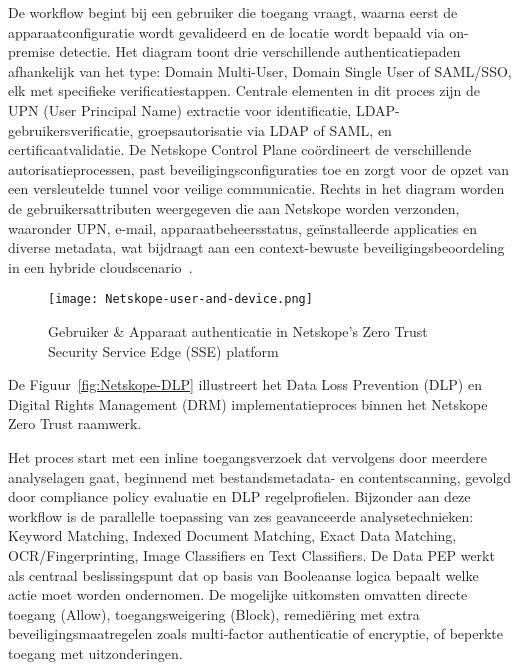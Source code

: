 De workflow begint bij een gebruiker die toegang vraagt, waarna eerst de apparaatconfiguratie wordt gevalideerd en de locatie wordt bepaald via on-premise detectie. Het diagram toont drie verschillende authenticatiepaden afhankelijk van het type: Domain Multi-User, Domain Single User of SAML/SSO, elk met specifieke verificatiestappen. Centrale elementen in dit proces zijn de UPN (User Principal Name) extractie voor identificatie, LDAP-gebruikersverificatie, groepsautorisatie via LDAP of SAML, en certificaatvalidatie. De Netskope Control Plane coördineert de verschillende autorisatieprocessen, past beveiligingsconfiguraties toe en zorgt voor de opzet van een versleutelde tunnel voor veilige communicatie. Rechts in het diagram worden de gebruikersattributen weergegeven die aan Netskope worden verzonden, waaronder UPN, e-mail, apparaatbeheersstatus, geïnstalleerde applicaties en diverse metadata, wat bijdraagt aan een context-bewuste beveiligingsbeoordeling in een hybride cloudscenario~\autocite{Netskope2024}.
\begin{figure}[h!]
  \centering
  \texttt{[image: Netskope-user-and-device.png]}
  \caption[Netskope Gebruiker \& Apparaat authenticatie]{Gebruiker \& Apparaat authenticatie in Netskope's Zero Trust Security Service Edge (SSE) platform~\autocite{Netskope2024}}
  \label{fig:Netskope-user-and-device}
\end{figure}

De Figuur~\ref{fig:Netskope-DLP} illustreert het Data Loss Prevention (DLP) en Digital Rights Management (DRM) implementatieproces binnen het Netskope Zero Trust raamwerk. 

\vspace{2ex}

Het proces start met een inline toegangsverzoek dat vervolgens door meerdere analyselagen gaat, beginnend met bestandsmetadata- en contentscanning, gevolgd door compliance policy evaluatie en DLP regelprofielen. Bijzonder aan deze workflow is de parallelle toepassing van zes geavanceerde analysetechnieken: Keyword Matching, Indexed Document Matching, Exact Data Matching, OCR/Fingerprinting, Image Classifiers en Text Classifiers. De Data PEP werkt als centraal beslissingspunt dat op basis van Booleaanse logica bepaalt welke actie moet worden ondernomen. De mogelijke uitkomsten omvatten directe toegang (Allow), toegangsweigering (Block), remediëring met extra beveiligingsmaatregelen zoals multi-factor authenticatie of encryptie, of beperkte toegang met uitzonderingen. 

